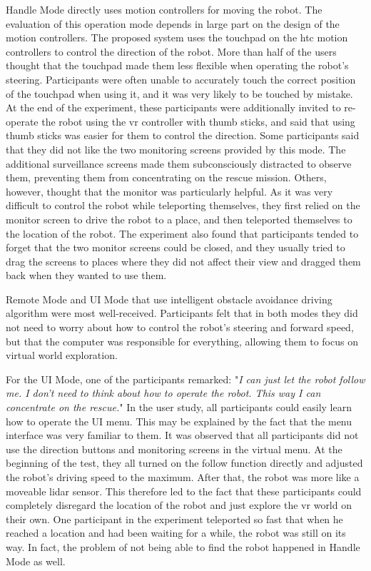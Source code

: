Handle Mode directly uses motion controllers for moving the robot. The evaluation of this operation mode depends in large part on the design of the motion controllers. The proposed system uses the touchpad on the \gls{htc} motion controllers to control the direction of the robot. More than half of the users thought that the touchpad made them less flexible when operating the robot's steering. Participants were often unable to accurately touch the correct position of the touchpad when using it, and it was very likely to be touched by mistake. At the end of the experiment, these participants were additionally invited to re-operate the robot using the \gls{vr} controller with thumb sticks, and said that using thumb sticks was easier for them to control the direction. Some participants said that they did not like the two monitoring screens provided by this mode. The additional surveillance screens made them subconsciously distracted to observe them, preventing them from concentrating on the rescue mission. Others, however, thought that the monitor was particularly helpful. As it was very difficult to control the robot while teleporting themselves, they first relied on the monitor screen to drive the robot to a place, and then teleported themselves to the location of the robot. The experiment also found that participants tended to forget that the two monitor screens could be closed, and they usually tried to drag the screens to places where they did not affect their view and dragged them back when they wanted to use them.

Remote Mode and UI Mode that use intelligent obstacle avoidance driving algorithm were most well-received. Participants felt that in both modes they did not need to worry about how to control the robot's steering and forward speed, but that the computer was responsible for everything, allowing them to focus on virtual world exploration.

For the UI Mode, one of the participants remarked: "\textit{I can just let the robot follow me. I don't need to think about how to operate the robot. This way I can concentrate on the rescue.}" In the user study, all participants could easily learn how to operate the UI menu. This may be explained by the fact that the menu interface was very familiar to them. It was observed that all participants did not use the direction buttons and monitoring screens in the virtual menu. At the beginning of the test, they all turned on the follow function directly and adjusted the robot's driving speed to the maximum. After that, the robot was more like a moveable \gls{lidar} sensor. This therefore led to the fact that these participants could completely disregard the location of the robot and just explore the \gls{vr} world on their own. One participant in the experiment teleported so fast that when he reached a location and had been waiting for a while, the robot was still on its way. In fact, the problem of not being able to find the robot happened in Handle Mode as well.


